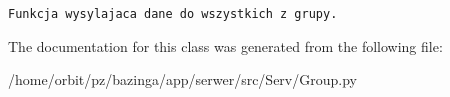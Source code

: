 \footnotesize\begin{verbatim}Funkcja wysylajaca dane do wszystkich z grupy.\end{verbatim}
\normalsize
 

The documentation for this class was generated from the following file:\begin{CompactItemize}
\item 
/home/orbit/pz/bazinga/app/serwer/src/Serv/Group.py\end{CompactItemize}
